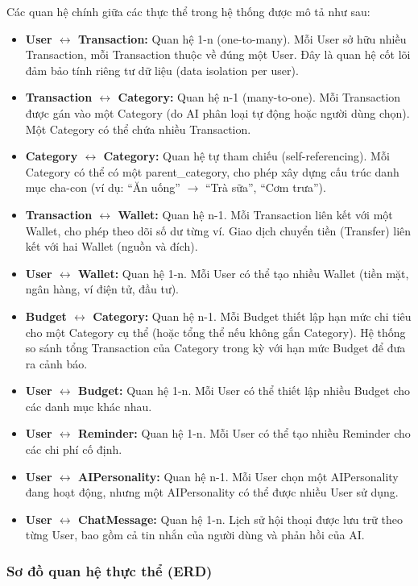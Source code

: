 Các quan hệ chính giữa các thực thể trong hệ thống được mô tả như sau:

\begin{itemize}
    \item \textbf{User $\leftrightarrow$ Transaction:} Quan hệ 1-n (one-to-many). Mỗi User sở hữu nhiều Transaction, mỗi Transaction thuộc về đúng một User. Đây là quan hệ cốt lõi đảm bảo tính riêng tư dữ liệu (data isolation per user).
    \item \textbf{Transaction $\leftrightarrow$ Category:} Quan hệ n-1 (many-to-one). Mỗi Transaction được gán vào một Category (do AI phân loại tự động hoặc người dùng chọn). Một Category có thể chứa nhiều Transaction.
    \item \textbf{Category $\leftrightarrow$ Category:} Quan hệ tự tham chiếu (self-referencing). Mỗi Category có thể có một parent\_category, cho phép xây dựng cấu trúc danh mục cha-con (ví dụ: ``Ăn uống'' $\rightarrow$ ``Trà sữa'', ``Cơm trưa'').
    \item \textbf{Transaction $\leftrightarrow$ Wallet:} Quan hệ n-1. Mỗi Transaction liên kết với một Wallet, cho phép theo dõi số dư từng ví. Giao dịch chuyển tiền (Transfer) liên kết với hai Wallet (nguồn và đích).
    \item \textbf{User $\leftrightarrow$ Wallet:} Quan hệ 1-n. Mỗi User có thể tạo nhiều Wallet (tiền mặt, ngân hàng, ví điện tử, đầu tư).
    \item \textbf{Budget $\leftrightarrow$ Category:} Quan hệ n-1. Mỗi Budget thiết lập hạn mức chi tiêu cho một Category cụ thể (hoặc tổng thể nếu không gắn Category). Hệ thống so sánh tổng Transaction của Category trong kỳ với hạn mức Budget để đưa ra cảnh báo.
    \item \textbf{User $\leftrightarrow$ Budget:} Quan hệ 1-n. Mỗi User có thể thiết lập nhiều Budget cho các danh mục khác nhau.
    \item \textbf{User $\leftrightarrow$ Reminder:} Quan hệ 1-n. Mỗi User có thể tạo nhiều Reminder cho các chi phí cố định.
    \item \textbf{User $\leftrightarrow$ AIPersonality:} Quan hệ n-1. Mỗi User chọn một AIPersonality đang hoạt động, nhưng một AIPersonality có thể được nhiều User sử dụng.
    \item \textbf{User $\leftrightarrow$ ChatMessage:} Quan hệ 1-n. Lịch sử hội thoại được lưu trữ theo từng User, bao gồm cả tin nhắn của người dùng và phản hồi của AI.
\end{itemize}

\subsubsection{Sơ đồ quan hệ thực thể (ERD)}

